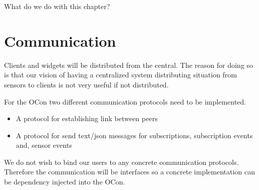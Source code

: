 \documentclass[../report.tex]{subfiles}
\begin{document}
\todo What do we do with this chapter?


\section{Communication}

Clients and widgets will be distributed from the central. The reason for doing so is that our vision of having a centralized system distributing situation from sensors to clients is not very useful if not distributed.

For the OCon two different communication protocols need to be implemented.\\

\begin{itemize}
    \item A protocol for establishing link between peers
    \item A protocol for send text/json messages for subscriptions, subscription events and, sensor events \\
\end{itemize}

We do not wish to bind our users to any concrete communication protocols. Therefore the communication will be interfaces so a concrete implementation can be dependency injected into the OCon.
\end{document}
